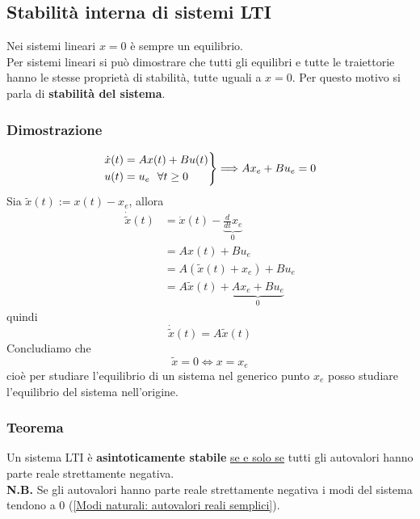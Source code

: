 \documentclass{article}
\numberwithin{equation}{subsection}
\let\oldsubsection\subsection%
\renewcommand{\subsection}{%
  \renewcommand{\theequation}{\thesubsection.\arabic{equation}}%
  \oldsubsection}%
\begin{document}
\subsection{Stabilità interna di sistemi LTI}
Nei sistemi lineari $x=0$ è sempre un equilibrio.\\
Per sistemi lineari si può dimostrare che tutti gli equilibri e tutte le traiettorie hanno le stesse proprietà di stabilità, tutte uguali a $x=0$. Per questo motivo si parla di \textbf{stabilità del sistema}.
\subsubsection*{Dimostrazione}
\begin{equation}
    \begin{rcases}
        \dot x(t) = Ax(t) + Bu(t)\\
        u(t) = u_e \ \ \forall t \geq 0
    \end{rcases}
    \Longrightarrow Ax_e + Bu_e = 0
\end{equation}
Sia $\tilde{x}(t) := x(t) - x_e$, allora
\begin{align*}
    \dot{\tilde{x}}(t) &= \dot x(t) - \underbrace{\frac{d}{dt}x_e}_{0}\\
    &=Ax(t)+Bu_e\\
    &=A(\tilde{x}(t)+x_e)+Bu_e\\
    &=A \tilde{x}(t) + \underbrace{Ax_e+Bu_e}_{0}
\end{align*}
quindi
\begin{equation}
    \dot{\tilde{x}}(t) = A \tilde{x}(t)
\end{equation}
Concludiamo che
\begin{equation}
    \tilde{x}=0 \Longleftrightarrow x = x_e
\end{equation}
cioè per studiare l'equilibrio di un sistema nel generico punto $x_e$ posso studiare l'equilibrio del sistema nell'origine.




\subsubsection*{Teorema} \label{Teorema parte reale negativa}
Un sistema LTI è \textbf{asintoticamente stabile} \underline{se e solo se} tutti gli autovalori hanno parte reale strettamente negativa.
\vspace*{0.1cm}\\
\textbf{N.B.} Se gli autovalori hanno parte reale strettamente negativa i modi del sistema tendono a 0 (\ref{Modi naturali: autovalori reali semplici}).
\end{document}
